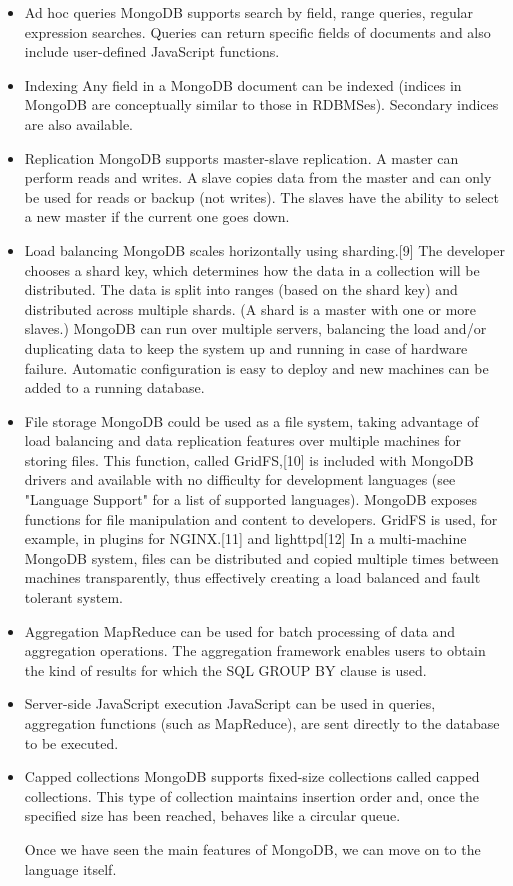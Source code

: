 \begin{itemize}

\item Ad hoc queries
MongoDB supports search by field, range queries, regular expression searches. Queries can return specific fields of documents and also include user-defined JavaScript functions.

\item Indexing
Any field in a MongoDB document can be indexed (indices in MongoDB are conceptually similar to those in RDBMSes). Secondary indices are also available.

\item Replication
MongoDB supports master-slave replication. A master can perform reads and writes. A slave copies data from the master and can only be used for reads or backup (not writes). The slaves have the ability to select a new master if the current one goes down.

\item Load balancing
MongoDB scales horizontally using sharding.[9] The developer chooses a shard key, which determines how the data in a collection will be distributed. The data is split into ranges (based on the shard key) and distributed across multiple shards. (A shard is a master with one or more slaves.)
MongoDB can run over multiple servers, balancing the load and/or duplicating data to keep the system up and running in case of hardware failure. Automatic configuration is easy to deploy and new machines can be added to a running database.

\item File storage
MongoDB could be used as a file system, taking advantage of load balancing and data replication features over multiple machines for storing files.
This function, called GridFS,[10] is included with MongoDB drivers and available with no difficulty for development languages (see "Language Support" for a list of supported languages). MongoDB exposes functions for file manipulation and content to developers. GridFS is used, for example, in plugins for NGINX.[11] and lighttpd[12]
In a multi-machine MongoDB system, files can be distributed and copied multiple times between machines transparently, thus effectively creating a load balanced and fault tolerant system.

\item Aggregation
MapReduce can be used for batch processing of data and aggregation operations. The aggregation framework enables users to obtain the kind of results for which the SQL GROUP BY clause is used.

\item Server-side JavaScript execution
JavaScript can be used in queries, aggregation functions (such as MapReduce), are sent directly to the database to be executed.

\item Capped collections
MongoDB supports fixed-size collections called capped collections. This type of collection maintains insertion order and, once the specified size has been reached, behaves like a circular queue.

Once we have seen the main features of MongoDB, we can move on to the language itself.
\end{itemize}
